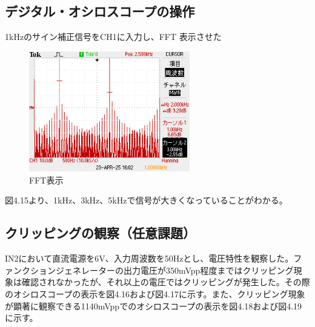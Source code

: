 \documentclass{jlreq}
\numberwithin{equation}{section}
\begin{document}
\subsection{デジタル・オシロスコープの操作}

1kHzのサイン補正信号をCH1に入力し、FFT 表示させた

\begin{figure}[H]
  \centering
  \includegraphics[width=70mm]{FFT.png}
  \caption{FFT表示}
\end{figure}

図4.15より、1kHz、3kHz、5kHzで信号が大きくなっていることがわかる。

\subsection{クリッピングの観察（任意課題）}
IN2において直流電源を6V、入力周波数を50Hzとし、電圧特性を観察した。ファンクションジェネレーターの出力電圧が350mVpp程度まではクリッピング現象は確認されなかったが、それ以上の電圧ではクリッピングが発生した。その際のオシロスコープの表示を図4.16および図4.17に示す。また、クリッピング現象が顕著に観察できる1140mVppでのオシロスコープの表示を図4.18および図4.19に示す。
\end{document}
